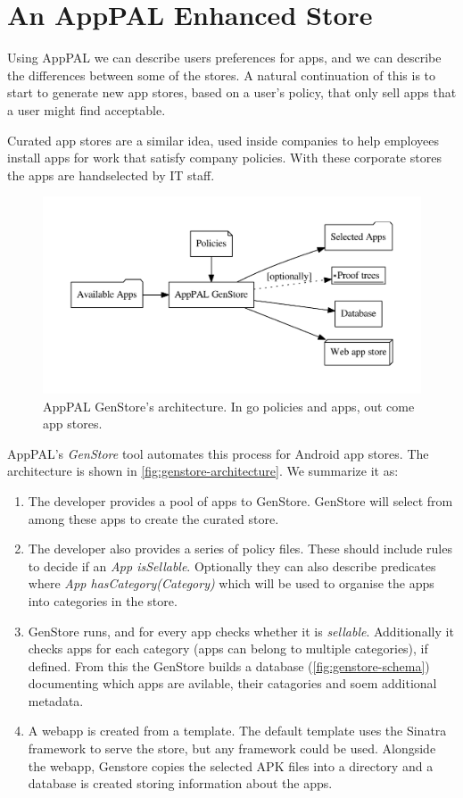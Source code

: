 \documentclass[thesis.tex]{subfiles}
\begin{document}
\section{An AppPAL Enhanced Store}

Using AppPAL we can describe users preferences for apps, and we can describe
the differences between some of the stores.  A natural continuation of this is
to start to generate new app stores, based on a user's policy, that only sell
apps that a user might find acceptable.

Curated app stores are a similar idea, used inside companies to help employees
install apps for work that satisfy company policies.  With these corporate stores the apps are handselected
by IT staff.  

\begin{figure}\centering
  \includegraphics[width=\textwidth]{figures/genstore.pdf}
  \caption[AppPAL GenStore's architecture.]{AppPAL GenStore's architecture.  In go policies and apps, out come app stores.}
  \label{fig:genstore-architecture}
\end{figure}

AppPAL's \emph{GenStore} tool automates this process for Android app stores.  The architecture is shown in \autoref{fig:genstore-architecture}. We summarize it as:

\begin{enumerate}
\item The developer provides a pool of apps to GenStore. GenStore will select from among these apps to create the curated store.
\item The developer also provides a series of policy files. These should include rules to decide if an \emph{App isSellable}.  Optionally they can also describe predicates where \emph{App hasCategory(Category)} which will be used to organise the apps into categories in the store.
\item GenStore runs, and for every app checks whether it is \emph{sellable}.  Additionally it checks apps for each category (apps can belong to multiple categories), if defined.
  From this the GenStore builds a database (\autoref{fig:genstore-schema}) documenting which apps are avilable, their catagories and soem additional metadata.
\item A webapp is created from a template.  The default template uses the Sinatra framework to serve the store, but any framework could be used.  Alongside the webapp, Genstore copies the selected APK files into a directory and a database is created storing information about the apps.
\end{enumerate}
\end{document}
